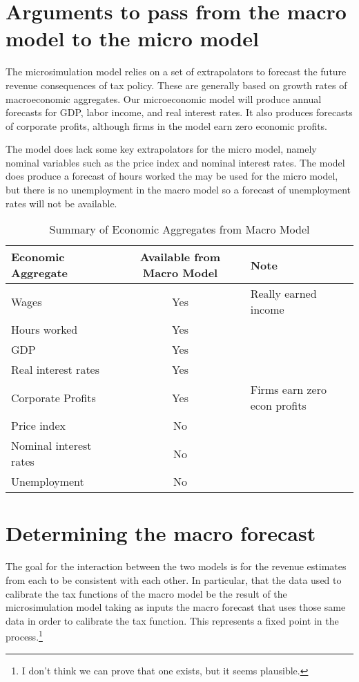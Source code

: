\documentclass[letterpaper,11pt]{article}
\theoremstyle{definition}
\begin{document}
\section{Arguments to pass from the macro model to the micro model}

The microsimulation model relies on a set of extrapolators to forecast the future revenue consequences of tax policy.  These are generally based on growth rates of macroeconomic aggregates.  Our microeconomic model will produce annual forecasts for GDP, labor income, and real interest rates.  It also produces forecasts of corporate profits, although firms in the model earn zero economic profits.

The model does lack some key extrapolators for the micro model, namely nominal variables such as the price index and nominal interest rates.  The model does produce a forecast of hours worked the may be used for the micro model, but there is no unemployment in the macro model so a forecast of unemployment rates will not be available.


\begin{table}[htbp]
  \centering
  \caption{Summary of Economic Aggregates from Macro Model}
    \begin{tabular}{lcl}
    \hline
    \hline
    Economic Aggregate & Available from Macro Model & Note \\
    \hline
    Wages & Yes   & Really earned income \\
    Hours worked & Yes   &  \\
    GDP   & Yes   &  \\
    Real interest rates & Yes   &  \\
    Corporate Profits & Yes   & Firms earn zero econ profits \\
    Price index & No    &  \\
    Nominal interest rates & No    &  \\
    Unemployment & No    &  \\
   \hline
   \hline
    \end{tabular}%
  \label{tab:macro_vars}%
\end{table}%


\section{Determining the macro forecast}

The goal for the interaction between the two models is for the revenue estimates from each to be consistent with each other.  In particular, that the data used to calibrate the tax functions of the macro model be the result of the microsimulation model taking as inputs the macro forecast that uses those same data in order to calibrate the tax function.  This represents a fixed point in the process.\footnote{I don't think we can prove that one exists, but it seems plausible.}
\end{document}
